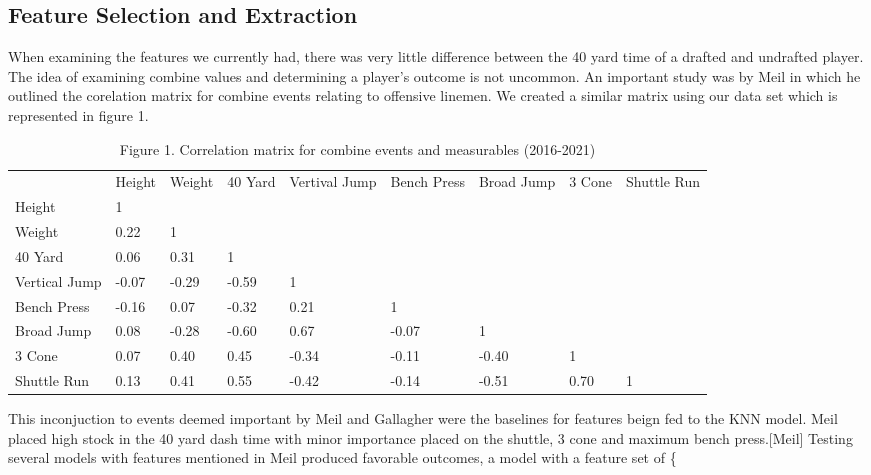 \documentclass[confrence]{IEEEtran}
\begin{document}
\subsection*{Feature Selection and Extraction}
When examining the features we currently had, there was very little difference between the 40 yard time of a drafted and undrafted player. 
The idea of examining combine values and determining a player's outcome is not uncommon. 
An important study was by Meil in which he outlined the corelation matrix for combine events relating to offensive linemen.
We created a similar matrix using our data set which is represented in figure 1. 
\begin{table*}[htbp]
\begin{tabular}{lllllllll}
              & Height & Weight & 40 Yard & Vertival Jump & Bench Press & Broad Jump & 3 Cone & Shuttle Run \\
Height        & 1      &        &         &               &             &            &        &             \\
Weight        & 0.22   & 1      &         &               &             &            &        &             \\
40 Yard       & 0.06   & 0.31   & 1       &               &             &            &        &             \\
Vertical Jump & -0.07  & -0.29  & -0.59   & 1             &             &            &        &             \\
Bench Press   & -0.16  & 0.07   & -0.32   & 0.21          & 1           &            &        &             \\
Broad Jump    & 0.08   & -0.28  & -0.60   & 0.67          & -0.07       & 1          &        &             \\
3 Cone        & 0.07   & 0.40   & 0.45    & -0.34         & -0.11       & -0.40      & 1      &             \\
Shuttle Run   & 0.13   & 0.41   & 0.55    & -0.42         & -0.14       & -0.51      & 0.70   & 1          
\end{tabular}
\caption*{Figure 1. Correlation matrix for combine events and measurables (2016-2021)}
\end{table*}
This inconjuction to events deemed important by Meil and Gallagher were the baselines for features beign fed to the KNN model. 
Meil placed high stock in the 40 yard dash time with minor importance placed on the shuttle, 3 cone and maximum bench press.[Meil]
Testing several models with features mentioned in Meil produced favorable outcomes, a model with a feature set of  \{
\end{document}
